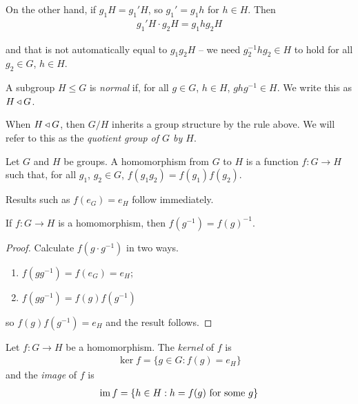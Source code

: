 \documentclass{../../template/note}
\begin{document}
    On the other hand, if $g_1H = g_1'H$, so $g_1' = g_1h$ for $h \in H$. Then
    \begin{align*}
        g_1'H \cdot g_2H = g_1hg_2H
    \end{align*}
    
    and that is not automatically equal to $g_1g_2H$ -- we need $g_2^{-1}hg_2 \in H$ to hold for all $g_2 \in G$, $h \in H$.

    \begin{definition}
        A subgroup $H \leq G$ is \emph{normal} if, for all $g \in G$, $h \in H$, $ghg^{-1} \in H$. We write this as $H \triangleleft G$.
    \end{definition}
    
    \begin{remark}
        When $H \triangleleft G$, then $G/H$ inherits a group structure by the rule above. We will refer to this as the \emph{quotient group of $G$ by $H$}.
    \end{remark}
    
    \begin{definition}[Homomorphisms]
        Let $G$ and $H$ be groups. A homomorphism from $G$ to $H$ is a function $f: G \to H$ such that, for all $g_1$, $g_2 \in G$, $f(g_1 g_2) = f(g_1) f(g_2)$.
    \end{definition}
    
    Results such as $f(e_G) = e_H$ follow immediately.
    
    \begin{lemma}
        If $f: G \to H$ is a homomorphism, then $f(g^{-1}) = f(g)^{-1}$.
    \end{lemma}
    
    \begin{proof}
        Calculate $f(g \cdot g^{-1})$ in two ways.
        \begin{enumerate}[label=\protect\circled{\arabic*}]
            \item $f(gg^{-1}) = f(e_G) = e_H$;
            \item $f(gg^{-1}) = f(g) f(g^{-1})$
        \end{enumerate}
        so $f(g) f(g^{-1}) = e_H$ and the result follows.        
    \end{proof}
    
    \begin{definition}
        Let $f: G \to H$ be a homomorphism. The \emph{kernel} of $f$ is
        \begin{align*}
            \ker f = \{g \in G : f(g) = e_H\}
        \end{align*}
        and the \emph{image} of $f$ is
        \begin{align*}
            \operatorname{im} f = \{h \in H: h = f(g) \text{ for some } g\}
        \end{align*}     
    \end{definition}
    
\end{document}
